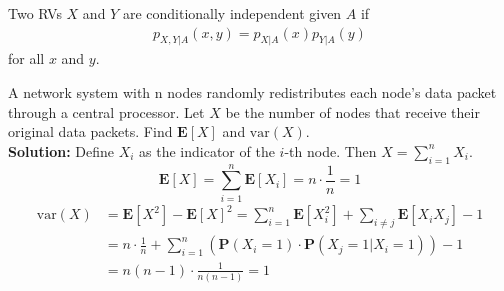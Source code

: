 \begin{definition}
    Two RVs $X$ and $Y$ are conditionally independent given $A$ if
    \begin{align}
        p_{X, Y|A}(x, y) = p_{X|A}(x) p_{Y|A}(y)
    \end{align}
    for all $x$ and $y$.
\end{definition}
\begin{example}
    A network system with n nodes randomly redistributes each node's data packet through a central processor. Let $X$ be the number of nodes that receive their original data packets. Find $\mathbf{E}[X]$ and $\text{var}(X)$. \\
    \textbf{Solution:} Define $X_i$ as the indicator of the $i$-th node. Then $X = \sum_{i=1}^n X_i$. 
    \begin{equation}
        \mathbf{E}[X] = \sum_{i=1}^{n} \mathbf{E}[X_i] = n \cdot \frac{1}{n} = 1
    \end{equation}
    \begin{equation}
    \begin{aligned}
        \text{var}(X) &= \mathbf{E}[X^2] - \mathbf{E}[X]^2 = \sum_{i=1}^{n} \mathbf{E}[X_i^2] + \sum_{i \neq j} \mathbf{E}[X_i X_j] - 1 \\ 
        &= n \cdot \frac{1}{n} + \sum_{i=1}^{n} \left(\mathbf{P}(X_i = 1) \cdot \mathbf{P}(X_j = 1 | X_i = 1)\right) - 1 \\ 
        &= n(n-1) \cdot \frac{1}{n(n-1)} = 1
    \end{aligned}
    \end{equation}
\end{example}
